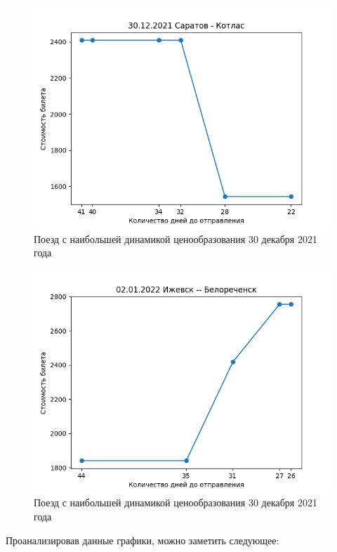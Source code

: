 \documentclass[conference]{IEEEtran}
\begin{document}
\begin{figure}
	\includegraphics[scale=0.5]{30122021}
	\caption{Поезд с наибольшей динамикой ценообразования 30 декабря 2021 года}
\end{figure}

\begin{figure}
	\includegraphics[scale=0.5]{02012022}
	\caption{Поезд с наибольшей динамикой ценообразования 30 декабря 2021 года}
\end{figure}

Проанализировав данные графики, можно заметить следующее:
\end{document}

